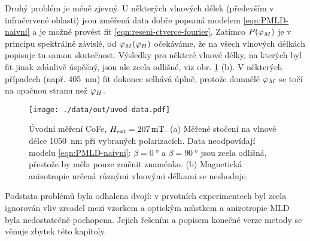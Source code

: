 Druhý problém je méně zjevný.
U některých vlnových délek (především v infračervené oblasti) jsou změřená data dobře popsaná modelem \eqref{eqn:PMLD-naivni} a je možné provést fit \eqref{eqn:reseni-ctverce-fourier}.
Zatímco $P(\varphi_M)$ je v principu spektrálně závislé, od $\varphi_M(\varphi_H)$ očekáváme, že na všech vlnových délkách popisuje tu samou skutečnost.
Výsledky pro některé vlnové délky, na kterých byl fit jinak zdánlivě úspěšný, jsou ale zcela odlišné, viz obr. \ref{fig:g-uvod-data} (b).
V některých případech (např. \SI{405}{\nano\meter}) fit dokonce selhává úplně, protože domnělé $\varphi_M$ se točí na opačnou stranu než $\varphi_H$.

\begin{figure}[htbp]
    \centering
    \texttt{[image: ./data/out/uvod-data.pdf]}
    \caption{Úvodní měření CoFe, $H_\textrm{ext}=\SI{207}{\milli\tesla}$. (a) Měřené stočení na vlnové délce \SI{1050}{\nano\meter} při vybraných polarizacích. Data neodpovídají modelu \eqref{eqn:PMLD-naivni}: $\beta=\SI{0}{\degree}$ a $\beta=\SI{90}{\degree}$ jsou zcela odlišná, přestože by měla pouze změnit znaménko. (b) Magnetická anizotropie určená různými vlnovými délkami se neshoduje.}
    \label{fig:g-uvod-data}
\end{figure}

Podstata problémů byla odhalena dvojí: v prvotních experimentech byl zcela ignorován vliv zrcadel mezi vzorkem a optickým můstkem a anizotropie MLD byla nedostatečně pochopena.
Jejich řešením a popisem konečné verze metody se věnuje zbytek této kapitoly.
